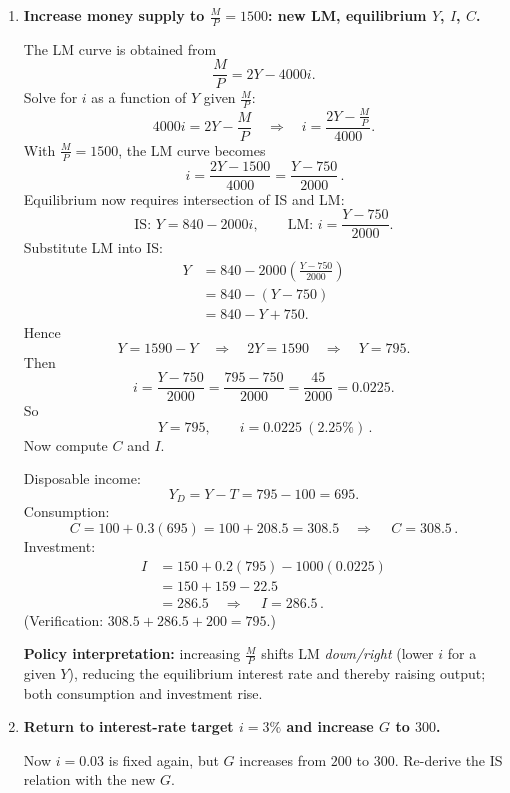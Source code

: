 \documentclass[12pt]{article}
\begin{document}
\begin{enumerate}[label=(\alph*)]
\item \textbf{Increase money supply to \(\frac{M}{P}=1500\): new LM, equilibrium \(Y\), \(I\), \(C\).}

The LM curve is obtained from
\[
\frac{M}{P} = 2Y - 4000i.
\]
Solve for \(i\) as a function of \(Y\) given \(\frac{M}{P}\):
\[
4000i = 2Y - \frac{M}{P}
\quad\Longrightarrow\quad
i = \frac{2Y - \frac{M}{P}}{4000}.
\]
With \(\frac{M}{P}=1500\), the LM curve becomes
\[
\boxed{\,i = \frac{2Y-1500}{4000}=\frac{Y-750}{2000}\, }.
\]
Equilibrium now requires intersection of IS and LM:
\[
\text{IS: } Y=840-2000i,
\qquad
\text{LM: } i=\frac{Y-750}{2000}.
\]
Substitute LM into IS:
\begin{align*}
Y &= 840 - 2000\left(\frac{Y-750}{2000}\right) \\
  &= 840 - (Y-750) \\
  &= 840 - Y + 750.
\end{align*}
Hence
\[
Y = 1590 - Y
\quad\Longrightarrow\quad
2Y = 1590
\quad\Longrightarrow\quad
Y=795.
\]
Then
\[
i=\frac{Y-750}{2000}=\frac{795-750}{2000}=\frac{45}{2000}=0.0225.
\]
So
\[
\boxed{\,Y=795,\qquad i=0.0225\ (2.25\%)\, }.
\]
Now compute \(C\) and \(I\).

Disposable income:
\[
Y_D=Y-T=795-100=695.
\]
Consumption:
\[
C=100+0.3(695)=100+208.5=308.5
\quad\Rightarrow\quad
\boxed{\,C=308.5\, }.
\]
Investment:
\begin{align*}
I &= 150 + 0.2(795) - 1000(0.0225) \\
  &= 150 + 159 - 22.5 \\
  &= 286.5
\quad\Rightarrow\quad
\boxed{\,I=286.5\, }.
\end{align*}
(Verification: \(308.5+286.5+200=795\).)

\textbf{Policy interpretation:} increasing \(\frac{M}{P}\) shifts LM \emph{down/right} (lower \(i\) for a given \(Y\)), reducing the equilibrium interest rate and thereby raising output; both consumption and investment rise.

\item \textbf{Return to interest-rate target \(i=3\%\) and increase \(G\) to \(300\).}

Now \(i=0.03\) is fixed again, but \(G\) increases from \(200\) to \(300\). Re-derive the IS relation with the new \(G\).


\end{enumerate}
\end{document}
